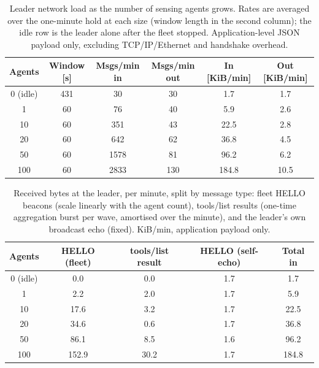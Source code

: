 \begin{table}[H]
\centering
\caption{Leader network load as the number of sensing agents grows. Rates are
averaged over the one-minute hold at each size (window length in the second
column); the idle row is the leader alone after the fleet stopped.
Application-level JSON payload only, excluding TCP/IP/Ethernet and handshake
overhead.}
\label{tab:net_load}
\begin{tabular}{cccccc}
\toprule
\textbf{Agents} & \textbf{Window [s]} & \textbf{Msgs/min in} & \textbf{Msgs/min out} & \textbf{In [KiB/min]} & \textbf{Out [KiB/min]} \\
\midrule
0 (idle) & 431 & 30 & 30 & 1.7 & 1.7 \\
1 & 60 & 76 & 40 & 5.9 & 2.6 \\
10 & 60 & 351 & 43 & 22.5 & 2.8 \\
20 & 60 & 642 & 62 & 36.8 & 4.5 \\
50 & 60 & 1578 & 81 & 96.2 & 6.2 \\
100 & 60 & 2833 & 130 & 184.8 & 10.5 \\
\bottomrule
\end{tabular}
\end{table}

\begin{table}[H]
\centering
\caption{Received bytes at the leader, per minute, split by message type: fleet
HELLO beacons (scale linearly with the agent count), {\ttfamily tools/list}
results (one-time aggregation burst per wave, amortised over the minute), and the
leader's own broadcast echo (fixed). KiB/min, application payload only.}
\label{tab:net_kind}
\begin{tabular}{ccccc}
\toprule
\textbf{Agents} & \textbf{HELLO (fleet)} & \textbf{tools/list result} & \textbf{HELLO (self-echo)} & \textbf{Total in} \\
\midrule
0 (idle) & 0.0 & 0.0 & 1.7 & 1.7 \\
1 & 2.2 & 2.0 & 1.7 & 5.9 \\
10 & 17.6 & 3.2 & 1.7 & 22.5 \\
20 & 34.6 & 0.6 & 1.7 & 36.8 \\
50 & 86.1 & 8.5 & 1.6 & 96.2 \\
100 & 152.9 & 30.2 & 1.7 & 184.8 \\
\bottomrule
\end{tabular}
\end{table}


